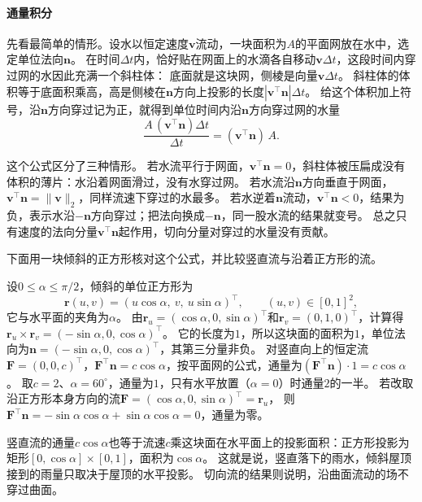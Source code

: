 \paragraph{通量积分}

先看最简单的情形。设水以恒定速度$\bm v$流动，一块面积为$A$的平面网放在水中，选定单位法向$\bm n$。
在时间$\Delta t$内，恰好贴在网面上的水滴各自移动$\bm v\Delta t$，这段时间内穿过网的水因此充满一个斜柱体：
底面就是这块网，侧棱是向量$\bm v\Delta t$。
斜柱体的体积等于底面积乘高，高是侧棱在$\bm n$方向上投影的长度$|\bm v^\top\bm n|\Delta t$。
给这个体积加上符号，沿$\bm n$方向穿过记为正，就得到单位时间内沿$\bm n$方向穿过网的水量
\[
 \frac{A\,(\bm v^\top\bm n)\Delta t}{\Delta t}=(\bm v^\top\bm n)\,A.
\]

这个公式区分了三种情形。
若水流平行于网面，$\bm v^\top\bm n=0$，斜柱体被压扁成没有体积的薄片：水沿着网面滑过，没有水穿过网。
若水流沿$\bm n$方向垂直于网面，$\bm v^\top\bm n=\lVert\bm v\rVert_2$，同样流速下穿过的水最多。
若水逆着$\bm n$流动，$\bm v^\top\bm n<0$，结果为负，表示水沿$-\bm n$方向穿过；把法向换成$-\bm n$，同一股水流的结果就变号。
总之只有速度的法向分量$\bm v^\top\bm n$起作用，切向分量对穿过的水量没有贡献。

下面用一块倾斜的正方形核对这个公式，并比较竖直流与沿着正方形的流。

\begin{example}[竖直流与切向流穿过倾斜正方形]
\label{ex:analysis-tilted-square-flux}
设$0\leq\alpha\leq\pi/2$，倾斜的单位正方形为
\[
 \bm r(u,v)=(u\cos\alpha,\ v,\ u\sin\alpha)^\top,\qquad (u,v)\in[0,1]^2,
\]
它与水平面的夹角为$\alpha$。
由$\bm r_u=(\cos\alpha,0,\sin\alpha)^\top$和$\bm r_v=(0,1,0)^\top$，计算得$\bm r_u\times\bm r_v=(-\sin\alpha,0,\cos\alpha)^\top$。
它的长度为$1$，所以这块面的面积为$1$，单位法向为$\bm n=(-\sin\alpha,0,\cos\alpha)^\top$，其第三分量非负。
对竖直向上的恒定流$\bm F=(0,0,c)^\top$，$\bm F^\top\bm n=c\cos\alpha$，按平面网的公式，通量为$(\bm F^\top\bm n)\cdot1=c\cos\alpha$。
取$c=2$、$\alpha=60^\circ$，通量为$1$，只有水平放置（$\alpha=0$）时通量$2$的一半。
若改取沿正方形本身方向的流$\bm F=(\cos\alpha,0,\sin\alpha)^\top=\bm r_u$，
则$\bm F^\top\bm n=-\sin\alpha\cos\alpha+\sin\alpha\cos\alpha=0$，通量为零。
\end{example}

竖直流的通量$c\cos\alpha$也等于流速$c$乘这块面在水平面上的投影面积：正方形投影为矩形$[0,\cos\alpha]\times[0,1]$，面积为$\cos\alpha$。
这就是说，竖直落下的雨水，倾斜屋顶接到的雨量只取决于屋顶的水平投影。
切向流的结果则说明，沿曲面流动的场不穿过曲面。

